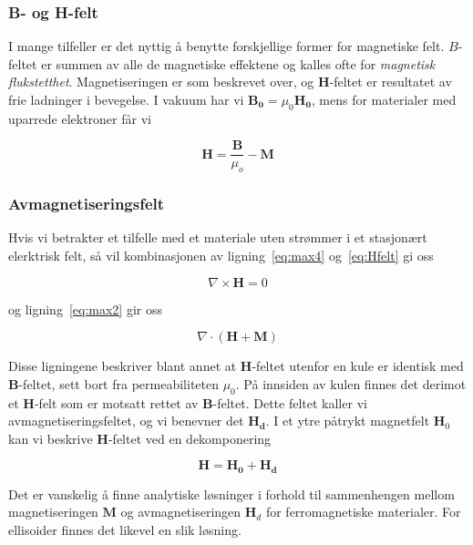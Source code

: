 \documentclass[a4paper,11pt, twocolumn]{article}
\begin{document}
\subsubsection{B- og H-felt}
I mange tilfeller er det nyttig å benytte forskjellige former for magnetiske felt. $B$-feltet er summen av alle de magnetiske effektene og kalles ofte for \textit{magnetisk flukstetthet}. Magnetiseringen er som beskrevet over, og $\mathbf{H}$-feltet er resultatet av frie ladninger i bevegelse. 
I vakuum har vi $\mathbf{B_0} = \mu_0 \mathbf{H_0}$, mens for materialer med uparrede elektroner får vi

\begin{equation}
	\mathbf{H}=\frac{\mathbf{B}}{\mu_o}-\mathbf{M}
	\label{eq:Hfelt}
\end{equation}

\subsubsection{Avmagnetiseringsfelt}
Hvis vi betrakter et tilfelle med et materiale uten strømmer i et stasjonært elerktrisk felt, så vil kombinasjonen av ligning~\ref{eq:max4} og~\ref{eq:Hfelt} gi oss

\begin{equation}
	\nabla\times\mathbf{H} = 0
	\label{eq:ampereAlternativ}
\end{equation}

og ligning~\ref{eq:max2} gir oss

\begin{equation}
	\nabla\cdot(\mathbf{H}+\mathbf{M})
	\label{eq:gaussAlternativ}
\end{equation}

Disse ligningene beskriver blant annet at $\mathbf H$-feltet utenfor en kule er identisk med $\mathbf B$-feltet, sett bort fra permeabiliteten $\mu_0$. På innsiden av kulen finnes det derimot et $\mathbf H$-felt som er motsatt rettet av $\mathbf B$-feltet. Dette feltet kaller vi avmagnetiseringsfeltet, og vi benevner det $\mathbf{H_d}$. I et ytre påtrykt magnetfelt $\mathbf H_0$ kan vi beskrive $\mathbf H$-feltet ved en dekomponering

\begin{equation}
	\mathbf{H} = \mathbf{H_0} + \mathbf{H_d}
	\label{eq:dekomponering}
\end{equation}



Det er vanskelig å finne analytiske løsninger i forhold til sammenhengen mellom magnetiseringen $\mathbf M$ og avmagnetiseringen $\mathbf H_d$ for ferromagnetiske materialer. For ellisoider finnes det likevel en slik løsning. 
\end{document}
